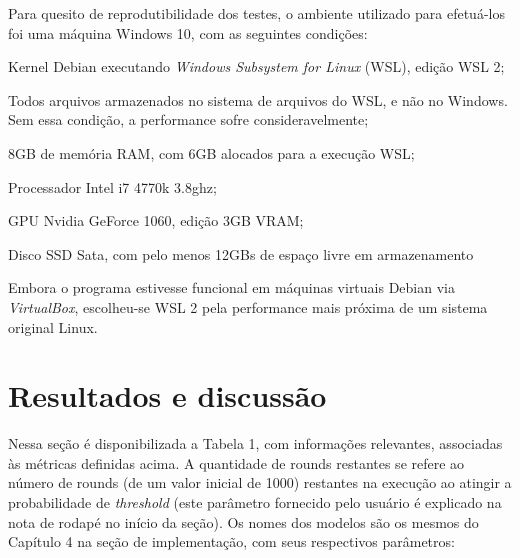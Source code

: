 Para quesito de reprodutibilidade dos testes, o ambiente utilizado para efetuá-los foi uma máquina Windows 10, com as seguintes condições:

\begin{alineas}
    \item Kernel Debian executando \textit{Windows Subsystem for Linux} (WSL), edição WSL 2;
    \item Todos arquivos armazenados no sistema de arquivos do WSL, e não no Windows. Sem essa condição, a performance sofre consideravelmente;
    \item 8GB de memória RAM, com 6GB alocados para a execução WSL;
    \item Processador Intel i7 4770k 3.8ghz;
    \item GPU Nvidia GeForce 1060, edição 3GB VRAM;
    \item Disco SSD Sata, com pelo menos 12GBs de espaço livre em armazenamento
\end{alineas}

Embora o programa estivesse funcional em máquinas virtuais Debian via \textit{VirtualBox}, escolheu-se WSL 2 pela performance mais próxima de um sistema original Linux.

\bigskip 

\section{Resultados e discussão}

Nessa seção é disponibilizada a Tabela 1, com informações relevantes, associadas às métricas definidas acima. A quantidade de rounds restantes se refere ao número de rounds (de um valor inicial de 1000) restantes na execução ao atingir a probabilidade de \textit{threshold} (este parâmetro fornecido pelo usuário é explicado na nota de rodapé no início da seção). Os nomes dos modelos são os mesmos do Capítulo 4 na seção de implementação, com seus respectivos parâmetros: 

